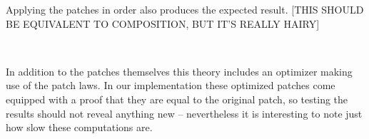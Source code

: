 Applying the patches in order also produces the expected result.
[THIS SHOULD BE EQUIVALENT TO COMPOSITION, BUT IT'S REALLY HAIRY]
\begin{code}%
%
\>[2]\AgdaFunction{\AgdaUnderscore{}}\AgdaSpace{}%
\AgdaSymbol{:}\AgdaSpace{}%
\AgdaSpace{}%
\AgdaSpace{}%
\AgdaSymbol{(}\AgdaSpace{}%
\AgdaSpace{}%
\AgdaSymbol{)}\AgdaSpace{}%
\AgdaSpace{}%
\AgdaSpace{}%
\AgdaSpace{}%
\AgdaSpace{}%
\AgdaSpace{}%
\AgdaInductiveConstructor{[]}\<%
\\
%
\>[2]\AgdaSymbol{\AgdaUnderscore{}}\AgdaSpace{}%
\AgdaSymbol{=}\AgdaSpace{}%
\AgdaSpace{}%
\AgdaSymbol{(}\AgdaSpace{}%
\AgdaSymbol{)}\AgdaSpace{}%
\AgdaSymbol{(}\AgdaSpace{}%
\AgdaSymbol{(}\AgdaSpace{}%
\AgdaSpace{}%
\AgdaSpace{}%
\AgdaSpace{}%
\AgdaInductiveConstructor{[]}\AgdaSymbol{))}\AgdaSpace{}%
\AgdaSpace{}%
\AgdaSpace{}%
\AgdaSymbol{\AgdaUnderscore{}}\<%
\end{code}

In addition to the patches themselves this theory includes an optimizer
making use of the patch laws. In our implementation these optimized patches come equipped
with a proof that they are equal to the original patch, so testing the results should not reveal
anything new -- nevertheless it is interesting to note just how slow these computations are.

